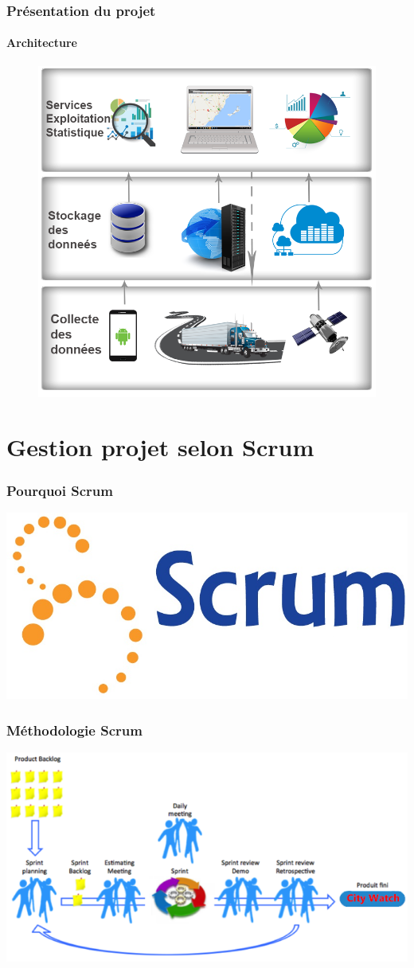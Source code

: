 \documentclass{beamer}
\begin{document}
\begin{frame}
    \frametitle{Présentation du projet}
    \framesubtitle{Architecture}
    \begin{figure}
        \centering
        \includegraphics[width=.73\textwidth]{figures/citywatch-modules.png}
    \end{figure}
\end{frame}

\section{Gestion projet selon Scrum}

\begin{frame}
    \frametitle{Pourquoi Scrum}
    \centering
    \includegraphics[width=.7\textwidth]{figures/scrum-logo}
\end{frame}

\begin{frame}
    \frametitle{Méthodologie Scrum}
    \centering
    \includegraphics{figures/scrum-model}
\end{frame}
\end{document}

